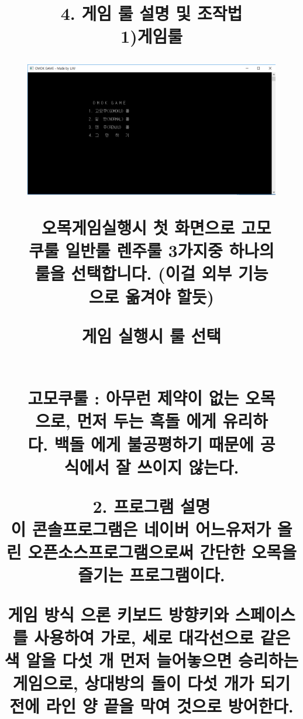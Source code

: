 \documentclass[a4paper, 11pt]{article}
\begin{document}
   \newpage
   \title{\textbf{\Huge2. 프로그램 설명}
   	\\ 이 콘솔프로그램은 네이버 어느유저가 올린 오픈소스프로그램으로써 간단한 오목을 즐기는 프로그램이다. 
   	
   	게임 방식 으론 키보드 방향키와 스페이스를 사용하여 가로, 세로 대각선으로 같은 색 알을 다섯 개 먼저 늘어놓으면 승리하는 게임으로, 상대방의 돌이 다섯 개가 되기 전에 라인 양 끝을 막여 것으로 방어한다. 
   
   
   
   \newpage
   \title{\textbf{\Huge4. 게임 룰 설명 및 조작법 }
   	\vspace{0.5cm}
   	\\ 1)게임룰
   	
   	\begin{figure}[h] %
   		\begin{center}
   			\includegraphics[width=1.0\linewidth]{OM1.png}
   		\end{center}
   		\caption{게임 실행시 룰 선택}
   	\vspace{0.5cm}
   	\ 오목게임실행시 첫 화면으로 고모쿠룰 일반룰 렌주룰 3가지중 하나의 룰을 선택합니다. (이걸 외부 기능으로 옮겨야 할듯)
   	\end{figure}
 
    \newpage
          \begin{figure}[h]
    	\begin{center}
    		\\ 고모쿠룰 :  아무런 제약이 없는 오목으로, 먼저 두는 흑돌 에게 유리하다. 백돌 에게 불공평하기 때문에 공식에서 잘 쓰이지 않는다. 
    		

\end{center}
\end{figure}}}
\end{document}
